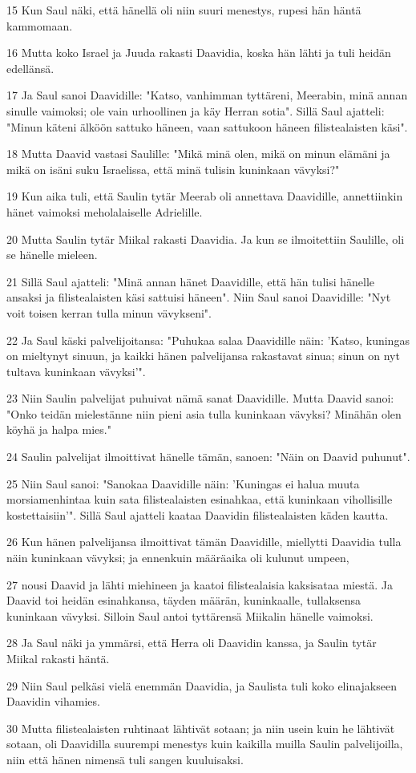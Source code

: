 \par 15 Kun Saul näki, että hänellä oli niin suuri menestys, rupesi hän häntä kammomaan.
\par 16 Mutta koko Israel ja Juuda rakasti Daavidia, koska hän lähti ja tuli heidän edellänsä.
\par 17 Ja Saul sanoi Daavidille: "Katso, vanhimman tyttäreni, Meerabin, minä annan sinulle vaimoksi; ole vain urhoollinen ja käy Herran sotia". Sillä Saul ajatteli: "Minun käteni älköön sattuko häneen, vaan sattukoon häneen filistealaisten käsi".
\par 18 Mutta Daavid vastasi Saulille: "Mikä minä olen, mikä on minun elämäni ja mikä on isäni suku Israelissa, että minä tulisin kuninkaan vävyksi?"
\par 19 Kun aika tuli, että Saulin tytär Meerab oli annettava Daavidille, annettiinkin hänet vaimoksi meholalaiselle Adrielille.
\par 20 Mutta Saulin tytär Miikal rakasti Daavidia. Ja kun se ilmoitettiin Saulille, oli se hänelle mieleen.
\par 21 Sillä Saul ajatteli: "Minä annan hänet Daavidille, että hän tulisi hänelle ansaksi ja filistealaisten käsi sattuisi häneen". Niin Saul sanoi Daavidille: "Nyt voit toisen kerran tulla minun vävykseni".
\par 22 Ja Saul käski palvelijoitansa: "Puhukaa salaa Daavidille näin: 'Katso, kuningas on mieltynyt sinuun, ja kaikki hänen palvelijansa rakastavat sinua; sinun on nyt tultava kuninkaan vävyksi'".
\par 23 Niin Saulin palvelijat puhuivat nämä sanat Daavidille. Mutta Daavid sanoi: "Onko teidän mielestänne niin pieni asia tulla kuninkaan vävyksi? Minähän olen köyhä ja halpa mies."
\par 24 Saulin palvelijat ilmoittivat hänelle tämän, sanoen: "Näin on Daavid puhunut".
\par 25 Niin Saul sanoi: "Sanokaa Daavidille näin: 'Kuningas ei halua muuta morsiamenhintaa kuin sata filistealaisten esinahkaa, että kuninkaan vihollisille kostettaisiin'". Sillä Saul ajatteli kaataa Daavidin filistealaisten käden kautta.
\par 26 Kun hänen palvelijansa ilmoittivat tämän Daavidille, miellytti Daavidia tulla näin kuninkaan vävyksi; ja ennenkuin määräaika oli kulunut umpeen,
\par 27 nousi Daavid ja lähti miehineen ja kaatoi filistealaisia kaksisataa miestä. Ja Daavid toi heidän esinahkansa, täyden määrän, kuninkaalle, tullaksensa kuninkaan vävyksi. Silloin Saul antoi tyttärensä Miikalin hänelle vaimoksi.
\par 28 Ja Saul näki ja ymmärsi, että Herra oli Daavidin kanssa, ja Saulin tytär Miikal rakasti häntä.
\par 29 Niin Saul pelkäsi vielä enemmän Daavidia, ja Saulista tuli koko elinajakseen Daavidin vihamies.
\par 30 Mutta filistealaisten ruhtinaat lähtivät sotaan; ja niin usein kuin he lähtivät sotaan, oli Daavidilla suurempi menestys kuin kaikilla muilla Saulin palvelijoilla, niin että hänen nimensä tuli sangen kuuluisaksi.

